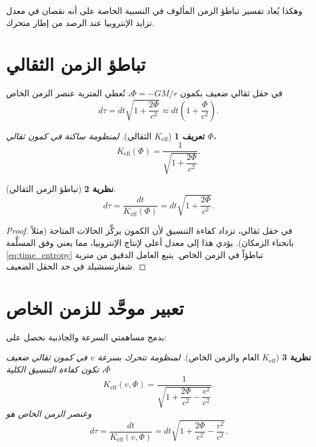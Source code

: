 \documentclass[11pt,a4paper]{article}
\newcommand{\Ke}{K_{\mathrm{eff}}}
\newtheorem{theorem}{نظرية}[section]
\newtheorem{definition}[theorem]{تعريف}
\begin{document}
	وهكذا يُعاد تفسير تباطؤ الزمن المألوف في النسبية الخاصة على أنه نقصان في معدل تزايد الإنتروبيا عند الرصد من إطار متحرك.
	
	\section{تباطؤ الزمن الثقالي}
	\label{sec:gr}
	
	في حقل ثقالي ضعيف بكمون \(\Phi = -GM/r\)، تُعطي المترية عنصر الزمن الخاص
	\begin{equation}
		d\tau = dt\sqrt{1 + \frac{2\Phi}{c^2}} \approx dt\left(1 + \frac{\Phi}{c^2}\right).
	\end{equation}
	
	\begin{definition}[\(\Ke\) الثقالي]
		لمنظومة ساكنة في كمون ثقالي \(\Phi\)،
		\[
		\Ke(\Phi) = \frac{1}{\sqrt{1 + \dfrac{2\Phi}{c^2}}}.
		\]
	\end{definition}
	
	\begin{theorem}[تباطؤ الزمن الثقالي]
		\begin{equation}
			d\tau = \frac{dt}{\Ke(\Phi)} = dt\sqrt{1 + \frac{2\Phi}{c^2}}.
		\end{equation}
	\end{theorem}
	
	\begin{proof}
		في حقل ثقالي، تزداد كفاءة التنسيق لأن الكمون يركِّز الحالات المتاحة (مثلاً بانحناء الزمكان). يؤدي هذا إلى معدل أعلى لإنتاج الإنتروبيا، مما يعني وفق المسلَّمة \ref{eq:time_entropy} تباطؤاً في الزمن الخاص. يتبع العامل الدقيق من مترية شفارتسشيلد في حد الحقل الضعيف.
	\end{proof}
	
	\section{تعبير موحَّد للزمن الخاص}
	\label{sec:unified}
	
	بدمج مساهمتي السرعة والجاذبية نحصل على:
	
	\begin{theorem}[\(\Ke\) العام والزمن الخاص]
		لمنظومة تتحرك بسرعة \(v\) في كمون ثقالي ضعيف \(\Phi\)، تكون كفاءة التنسيق الكلية
		\begin{equation}
			\Ke(v,\Phi) = \frac{1}{\sqrt{1 + \dfrac{2\Phi}{c^2} - \dfrac{v^2}{c^2}}}.
		\end{equation}
		وعنصر الزمن الخاص هو
		\begin{equation}
			d\tau = \frac{dt}{\Ke(v,\Phi)} = dt\sqrt{1 + \frac{2\Phi}{c^2} - \frac{v^2}{c^2}}.
		\end{equation}
	\end{theorem}
	
\end{document}

